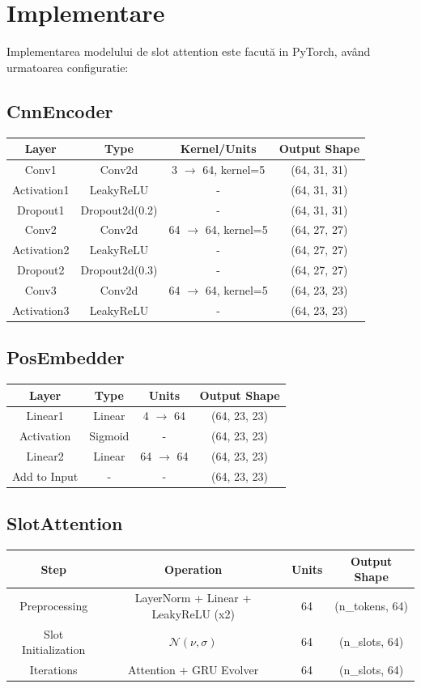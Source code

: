 \section{Implementare}
Implementarea modelului de slot attention este facută in PyTorch, având urmatoarea configuratie:

\subsection*{CnnEncoder}
\begin{tabular}{|c|c|c|c|}
\hline
Layer & Type & Kernel/Units & Output Shape \\
\hline
Conv1 & Conv2d & 3 $\rightarrow$ 64, kernel=5 & (64, 31, 31) \\
Activation1 & LeakyReLU & - & (64, 31, 31) \\
Dropout1 & Dropout2d(0.2) & - & (64, 31, 31) \\
Conv2 & Conv2d & 64 $\rightarrow$ 64, kernel=5 & (64, 27, 27) \\
Activation2 & LeakyReLU & - & (64, 27, 27) \\
Dropout2 & Dropout2d(0.3) & - & (64, 27, 27) \\
Conv3 & Conv2d & 64 $\rightarrow$ 64, kernel=5 & (64, 23, 23) \\
Activation3 & LeakyReLU & - & (64, 23, 23) \\
\hline
\end{tabular}
\subsection*{PosEmbedder}
\begin{tabular}{|c|c|c|c|}
\hline
Layer & Type & Units & Output Shape \\
\hline
Linear1 & Linear & 4 $\rightarrow$ 64 & (64, 23, 23) \\
Activation & Sigmoid & - & (64, 23, 23) \\
Linear2 & Linear & 64 $\rightarrow$ 64 & (64, 23, 23) \\
Add to Input & - & - & (64, 23, 23) \\
\hline
\end{tabular}
\subsection*{SlotAttention}
\begin{tabular}{|c|c|c|c|}
\hline
Step & Operation & Units & Output Shape \\
\hline
Preprocessing & LayerNorm + Linear + LeakyReLU (x2) & 64 & (n\_tokens, 64) \\
Slot Initialization & $\mathcal{N}(\nu, \sigma)$ & 64 & (n\_slots, 64) \\
Iterations & Attention + GRU Evolver & 64 & (n\_slots, 64) \\
\hline
\end{tabular}
